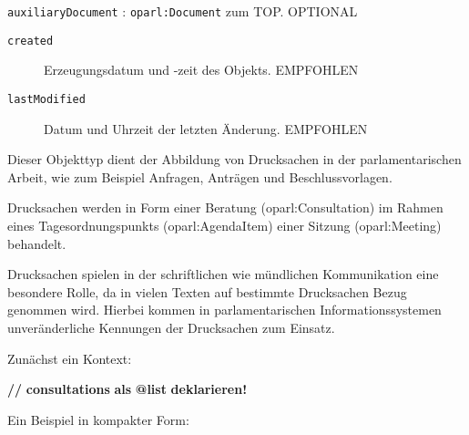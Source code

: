 \documentclass[,a4paper]{article}
\newenvironment{Shaded}{}{}
\newcommand{\ErrorTok}[1]{\textcolor[rgb]{1.00,0.00,0.00}{\textbf{{#1}}}}
\begin{document}
\texttt{auxiliaryDocument} : \texttt{oparl:Document} zum TOP. OPTIONAL

\begin{description}
\item[\texttt{created}]
Erzeugungsdatum und -zeit des Objekts. EMPFOHLEN
\item[\texttt{lastModified}]
Datum und Uhrzeit der letzten Änderung. EMPFOHLEN
\end{description}


Dieser Objekttyp dient der Abbildung von Drucksachen in der
parlamentarischen Arbeit, wie zum Beispiel Anfragen, Anträgen und
Beschlussvorlagen.

Drucksachen werden in Form einer Beratung (oparl:Consultation) im Rahmen
eines Tagesordnungspunkts (oparl:AgendaItem) einer Sitzung
(oparl:Meeting) behandelt.

Drucksachen spielen in der schriftlichen wie mündlichen Kommunikation
eine besondere Rolle, da in vielen Texten auf bestimmte Drucksachen
Bezug genommen wird. Hierbei kommen in parlamentarischen
Informationssystemen unveränderliche Kennungen der Drucksachen zum
Einsatz.

Zunächst ein Kontext:

\begin{Shaded}
\begin{Highlighting}[]
\ErrorTok{//} \ErrorTok{consultations} \ErrorTok{als} \ErrorTok{@list} \ErrorTok{deklarieren!}
\end{Highlighting}
\end{Shaded}

Ein Beispiel in kompakter Form:
\end{document}
